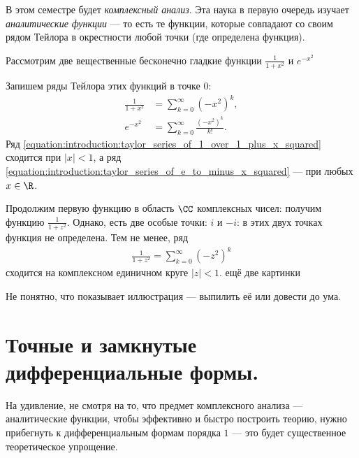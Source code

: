 В этом семестре будет \textit{комплексный анализ}. Эта наука в первую очередь изучает \textit{аналитические функции} --- то есть те функции, которые совпадают со своим рядом Тейлора в окрестности любой точки (где определена функция).

Рассмотрим две вещественные бесконечно гладкие функции $\frac{1}{1+x^{2}}$ и $e^{-x^{2}}$

\begin{figure}[ht]
    \centering
    \caption{}
    \label{fig:similar-plots}
\end{figure}

Запишем ряды Тейлора этих функций в точке $0$:
\begin{align}
 \label{equation:introduction:taylor_series_of_1_over_1_plus_x_squared}
 \frac{1}{1+x^{2}} &= \sum_{k=0}^{\infty} (-x^{2})^{k}, \\
 \label{equation:introduction:taylor_series_of_e_to_minus_x_squared}
 e^{-x^{2}} &= \sum_{k=0}^{\infty}  \frac{(-x^{2})^{k}}{k!}.
\end{align} Ряд \eqref{equation:introduction:taylor_series_of_1_over_1_plus_x_squared} сходится при $\left| x \right| < 1$, а ряд \eqref{equation:introduction:taylor_series_of_e_to_minus_x_squared} --- при любых $x \in \R$.

Продолжим первую функцию в область $\CC$ комплексных чисел: получим функцию $\frac{1}{1 + z^{2}}$. Однако, есть две особые точки: $i$ и $-i$: в этих двух точках функция не определена. Тем не менее, ряд \begin{align*}
 \frac{1}{1+z^{2}} = \sum_{k=0}^{\infty} (-z^{2})^{k}
\end{align*}  сходится на комплексном единичном круге $\left| z \right| < 1$. {\color{red} ещё две картинки}

{\color{red} Не понятно, что показывает иллюстрация --- выпилить её или довести до ума.}

\section{Точные и замкнутые дифференциальные формы.}

На удивление, не смотря на то, что предмет комплексного анализа --- аналитические функции, чтобы эффективно и быстро построить теорию, нужно прибегнуть к дифференциальным формам порядка $1$ --- это будет существенное теоретическое упрощение.

